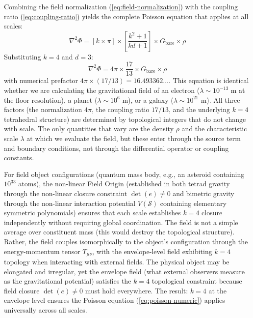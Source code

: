 \documentclass[aps,prd,preprint,superscriptaddress,showpacs,preprintnumbers,amsmath,amssymb,nofootinbib]{revtex4-2}
\begin{document}
Combining the field normalization (\ref{eq:field-normalization}) with the coupling ratio (\ref{eq:coupling-ratio}) yields the complete Poisson equation that applies at all scales:
\begin{equation}
\nabla^2\Phi = \left[k\times\pi\right] \times \left[\frac{k^2+1}{kd+1}\right] \times G_{\text{bare}} \times \rho
\label{eq:poisson-general}
\end{equation}
Substituting $k=4$ and $d=3$:
\begin{equation}
\nabla^2\Phi = 4\pi \times \frac{17}{13} \times G_{\text{bare}} \times \rho
\label{eq:poisson-numeric}
\end{equation}
with numerical prefactor $4\pi \times (17/13) = 16.493362\ldots$. This equation is identical whether we are calculating the gravitational field of an electron ($\lambda \sim 10^{-13}$ m at the floor resolution), a planet ($\lambda \sim 10^6$ m), or a galaxy ($\lambda \sim 10^{21}$ m). All three factors (the normalization $4\pi$, the coupling ratio $17/13$, and the underlying $k=4$ tetrahedral structure) are determined by topological integers that do not change with scale. The only quantities that vary are the density $\rho$ and the characteristic scale $\lambda$ at which we evaluate the field, but these enter through the source term and boundary conditions, not through the differential operator or coupling constants.

For field object configurations (quantum mass body, e.g., an asteroid containing $10^{33}$ atoms), the non-linear Field Origin (established in both tetrad gravity through the non-linear closure constraint $\det(e) \neq 0$ and bimetric gravity through the non-linear interaction potential $V(\mathcal{S})$ containing elementary symmetric polynomials) ensures that each scale establishes $k=4$ closure independently without requiring global coordination. The field is not a simple average over constituent mass (this would destroy the topological structure). Rather, the field couples isomorphically to the object's configuration through the energy-momentum tensor $T_{\mu\nu}$, with the envelope-level field exhibiting $k=4$ topology when interacting with external fields. The physical object may be elongated and irregular, yet the envelope field (what external observers measure as the gravitational potential) satisfies the $k=4$ topological constraint because field closure $\det(e) \neq 0$ must hold everywhere. The result: $k=4$ at the envelope level ensures the Poisson equation (\ref{eq:poisson-numeric}) applies universally across all scales.
\end{document}

